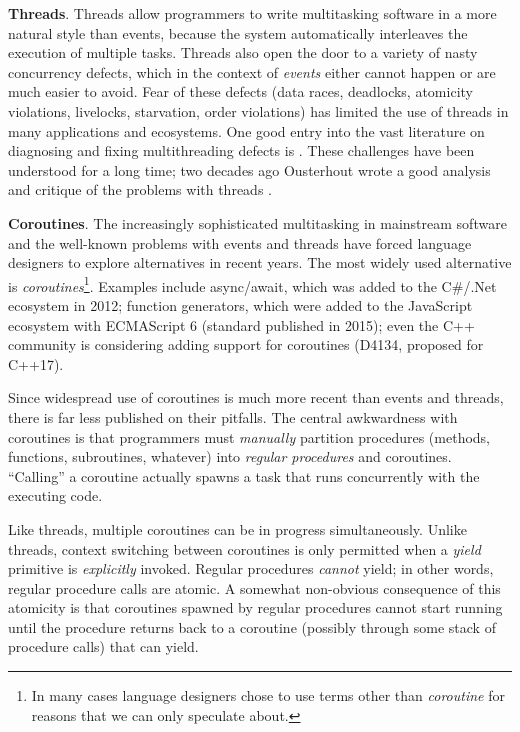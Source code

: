 \documentclass[pldi,10pt,preprint]{sigplanconf-pldi16}
\begin{document}
\textbf{Threads}.
Threads allow programmers to write multitasking software in a more natural style than events, because the system automatically interleaves the execution of multiple tasks.
Threads also open the door to a variety of nasty concurrency defects, which in the context of \emph{events} either cannot happen or are much easier to avoid.
Fear of these defects (data races, deadlocks, atomicity violations, livelocks, starvation, order violations) has limited the use of threads in many applications and ecosystems.
One good entry into the vast literature on diagnosing and fixing multithreading defects is \cite{Lu2008}.
These challenges have been understood for a long time; two decades ago Ousterhout wrote a good analysis and critique of the problems with threads \cite{Ousterhout1996}.

\textbf{Coroutines}.
The increasingly sophisticated multitasking in mainstream software and the well-known problems with events and threads have forced language designers to explore alternatives in recent years.
The most widely used alternative is \emph{coroutines}\footnote{In many cases language designers chose to use terms other than \emph{coroutine} for reasons that we can only speculate about.}.
Examples include async/await, which was added to the C\#/.Net ecosystem in 2012; function generators, which were added to the JavaScript ecosystem with ECMAScript 6 (standard published in 2015); even the C++ community is considering adding support for coroutines (D4134, proposed for C++17).

Since widespread use of coroutines is much more recent than events and threads, there is far less published on their pitfalls.
The central awkwardness with coroutines is that programmers must \emph{manually} partition procedures (methods, functions, subroutines, whatever) into \emph{regular procedures} and coroutines.
``Calling'' a coroutine actually spawns a task that runs concurrently with the executing code.

Like threads, multiple coroutines can be in progress simultaneously.
Unlike threads, context switching between coroutines is only permitted when a \emph{yield} primitive is \emph{explicitly} invoked.
Regular procedures \emph{cannot} yield; in other words, regular procedure calls are atomic.
A somewhat non-obvious consequence of this atomicity is that coroutines spawned by regular procedures cannot start running until the procedure returns back to a coroutine (possibly through some stack of procedure calls) that can yield.
\end{document}
